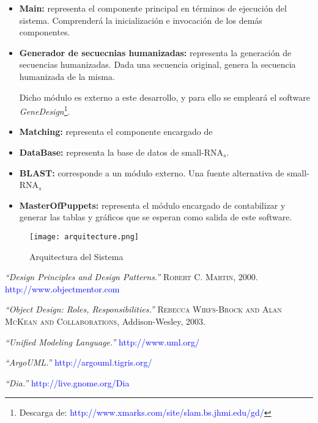 \documentclass[12pt,a4paper,spanish]{article}
\begin{document}
\begin{itemize}
  \item \textbf{Main:} representa el componente principal en términos de ejecución del sistema. Comprenderá la  
  inicialización e invocación de los demás componentes.

  \item \textbf{Generador de secuecnias humanizadas:} representa la generación de secuencias humanizadas. Dada una secuencia original, genera la secuencia humanizada de la misma.


Dicho
   módulo es externo a este desarrollo, y para ello se empleará el software \emph{GeneDesign}\footnote{Descarga de:  
  \textcolor{blue}{http://www.xmarks.com/site/slam.bs.jhmi.edu/gd/}}.

  \item \textbf{Matching:} representa el componente encargado de

  \item \textbf{DataBase:} representa la base de datos de small-RNA$_s$.

  \item \textbf{BLAST:} corresponde a un módulo externo. Una fuente alternativa de small-RNA$_s$ 

  \item \textbf{MasterOfPuppets:} representa el módulo encargado de contabilizar y generar las tablas y gráficos que se  
  esperan como salida de este software. 
\end{itemize}


\begin{figure}[!hbtp]
	\begin{center}
		\texttt{[image: arquitecture.png]}
		\caption{Arquitectura del Sistema}
		\label{arquitecture}
	\end{center}
\end{figure}





\begin{thebibliography}{99}
\small  {} {\em{“Design Principles and Design Patterns.”}} 
		\textsc{Robert C. Martin}, 2000. \textcolor{blue}{http://www.objectmentor.com}
  
\small  {} {\em{“Object Design: Roles, Responsibilities.”}} 
		\textsc{Rebecca Wirfs-Brock and Alan McKean and Collaborations}, Addison-Wesley, 2003.  

\small  {} {\em{“Unified Modeling Language.”}} \textcolor{blue}{http://www.uml.org/}

\small  {} {\em{“ArgoUML.”}} \textcolor{blue}{http://argouml.tigris.org/}

\small {} {\em{“Dia.”}} \textcolor{blue}{http://live.gnome.org/Dia}
\end{thebibliography}
\end{document}
